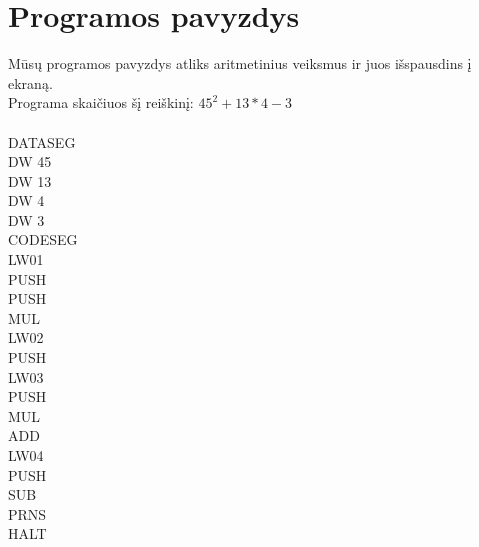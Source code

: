 \section{Programos pavyzdys}
	Mūsų programos pavyzdys atliks aritmetinius veiksmus ir juos išspausdins į ekraną.\\
	Programa skaičiuos šį reiškinį: \(45^2 + 13*4 - 3\)\\\\
	DATASEG\\
	DW 45\\
	DW 13\\
	DW 4\\
	DW 3\\
	CODESEG\\
	LW01\\
	PUSH\\
	PUSH\\
	MUL\\
	LW02\\
	PUSH\\
	LW03\\
	PUSH\\
	MUL\\
	ADD\\
	LW04\\
	PUSH\\
	SUB\\
	PRNS\\
	HALT\\